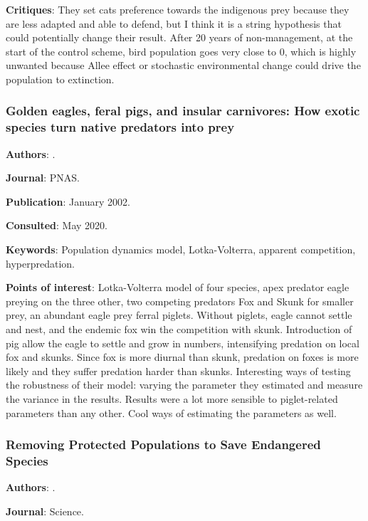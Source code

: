 \documentclass[12pt,a4paper]{article}
\begin{document}
\textbf{Critiques}: They set cats preference towards the indigenous prey because they are less adapted and able to defend, but I think it is a string hypothesis that could potentially change their result. After 20 years of non-management, at the start of the control scheme, bird population goes very close to 0, which is highly unwanted because Allee effect or stochastic environmental change could drive the population to extinction.

\newpage

\subsubsection*{Golden eagles, feral pigs, and insular carnivores: How exotic species turn native predators into prey}

\textbf{Authors}: \cite{roemer2002eagle}.

\textbf{Journal}: PNAS.

\textbf{Publication}: January 2002.

\textbf{Consulted}: May 2020.

\textbf{Keywords}: Population dynamics model, Lotka-Volterra, apparent competition, hyperpredation.

\textbf{Points of interest}: Lotka-Volterra model of four species, apex predator eagle preying on the three other, two competing predators Fox and Skunk for smaller prey, an abundant eagle prey ferral piglets. Without piglets, eagle cannot settle and nest, and the endemic fox win the competition with skunk. Introduction of pig allow the eagle to settle and grow in numbers, intensifying predation on local fox and skunks. Since fox is more diurnal than skunk, predation on foxes is more likely and they suffer predation harder than skunks.
Interesting ways of testing the robustness of their model: varying the parameter they estimated and measure the variance in the results. Results were a lot more sensible to piglet-related parameters than any other. Cool ways of estimating the parameters as well.

\newpage

\subsubsection*{Removing Protected Populations to Save Endangered Species}

\textbf{Authors}: \cite{courchamp2003removing}.

\textbf{Journal}: Science.
\end{document}
